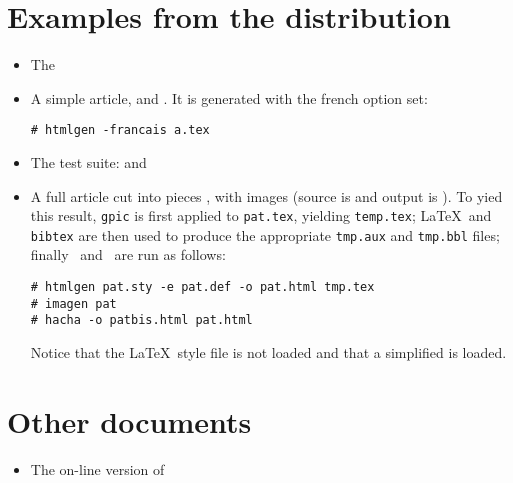\documentclass{article}
\begin{document}
\section*{Examples from the distribution}

\begin{itemize}
\item The 
\item A simple article,   and . It is
generated with the french option set:
\begin{verbatim}
# htmlgen -francais a.tex
\end{verbatim}
\item The test suite:  and 
\item A full article cut into pieces , with images (source is 
and output is ). To yied this result, \verb+gpic+ is first
applied to \verb+pat.tex+, yielding \verb+temp.tex+; \LaTeX\ and
\texttt{bibtex} are then used to produce the appropriate \verb+tmp.aux+ and
\verb+tmp.bbl+ files; finally \hevea\ and \hacha\ are run as
follows:
\begin{verbatim}
# htmlgen pat.sty -e pat.def -o pat.html tmp.tex
# imagen pat
# hacha -o patbis.html pat.html 
\end{verbatim}
Notice that the \LaTeX\ style file  is not loaded and
that a simplified  is loaded.
\end{itemize}

\section*{Other documents}
\begin{itemize}
\item The on-line version of 
\end{itemize}
\end{document}
